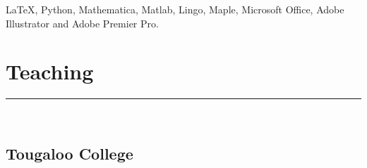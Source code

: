 \documentclass[12pt]{book}
\begin{document}
\LaTeX, Python, Mathematica, Matlab, Lingo, Maple, Microsoft Office, Adobe Illustrator and Adobe Premier Pro. \\


\section*{Teaching}
\rule{\textwidth}{1pt}\\






\subsection*{Tougaloo College}
	\vspace{1em}
\end{document}
